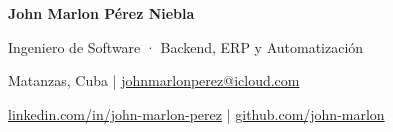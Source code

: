 {\centering
  {\fontsize{23}{26}\selectfont\bfseries John Marlon Pérez Niebla\par}
  \vspace{2pt}
  {\fontsize{11.5}{13.8}\selectfont Ingeniero de Software · Backend, ERP y Automatización\par}
  \vspace{4pt}
  {\normalsize
  Matanzas, Cuba \enspace|\enspace
  \href{mailto:johnmarlonperez@icloud.com}{johnmarlonperez@icloud.com}\par}
  \vspace{2pt}
  {\normalsize
  \href{https://www.linkedin.com/in/john-marlon-perez}{\mbox{linkedin.com/in/john-marlon-perez}} \enspace|\enspace
  \href{https://github.com/john-marlon}{\mbox{github.com/john-marlon}}\par}
}
